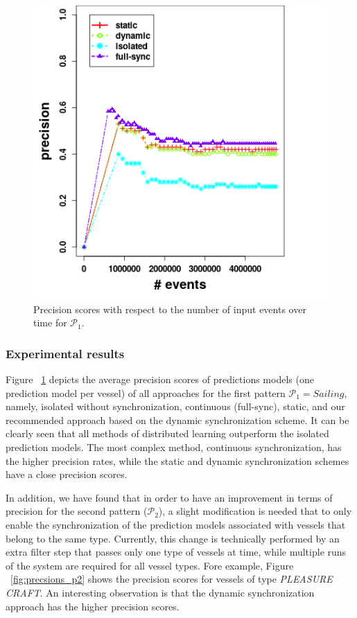 \begin{figure}[h]
	
	\includegraphics[width=.5\textwidth]{figures/precision.png}
	
	\caption{Precision scores with respect to the number of input events over time for $\mathcal{P}_1$.}
	\label{fig:precsions}
\end{figure}

\subsubsection*{Experimental results} Figure ~\ref{fig:precsions} depicts the average precision scores of predictions models (one prediction model per vessel) of all approaches for the first pattern $\mathcal{P}_1=Sailing$, namely, isolated without synchronization, continuous (full-sync), static, and our recommended approach based on the dynamic synchronization scheme. It can be clearly seen that all methods of distributed learning outperform the isolated prediction models. The most complex method, continuous synchronization, has the higher precision rates, while the static and dynamic synchronization schemes have a close precision scores.

In addition, we have found that in order to have an improvement in terms of precision for the second pattern ($\mathcal{P}_2$), a slight modification is needed that to only enable the synchronization of the prediction models associated with vessels that belong to the same type. Currently, this change is technically performed by an extra filter step that passes only one type of vessels at time, while multiple runs of the system are required for all vessel types. Fore example, Figure ~\ref{fig:precsions_p2} shows the precision scores for vessels of type \textit{PLEASURE CRAFT}. An interesting observation is that the dynamic synchronization approach has the higher precision scores.  

